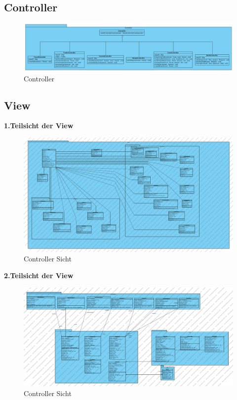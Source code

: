 \documentclass[fontsize=12pt,paper=a4,twoside]{scrartcl}
\begin{document}
\subsection{Controller}
\begin{figure}[H]
\begin{center}
  \includegraphics[width=\linewidth]{../GT_Modulsicht/src/Controllersicht.png}
    \caption{Controller}
\end{center}
\end{figure}

\subsection{View}

\textbf{1.Teilsicht der View}
\begin{figure}[H] 
\begin{center}
 \includegraphics[width=\textwidth]{../GT_Modulsicht/PDFs/View-Subdiagramm_Buttons.pdf}
  \caption{Controller Sicht}
  \label{fig:boat1}
\end{center}
\end{figure}

\newpage

\textbf{2.Teilsicht der View}

\begin{figure}[H] 
\begin{center}
 \includegraphics[width=\textwidth]{../GT_Modulsicht/PDFs/View-SubDiagramm_Menue+MenueButtons.pdf}
  \caption{Controller Sicht}
  \label{fig:boat1}
\end{center}
\end{figure}
\end{document}
